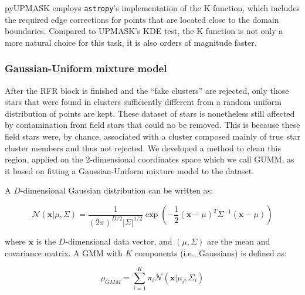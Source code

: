 \documentclass{aa}
\begin{document}
 pyUPMASK employs \texttt{astropy}'s implementation of the K function, which
 includes the required edge corrections for points that are located close to
 the domain boundaries. Compared to UPMASK's KDE test, the K function is not
 only a more natural choice for this task, it is also orders of magnitude
 faster.



\subsubsection{Gaussian-Uniform mixture model}
 \label{sssec:gumm}

 After the RFR block is finished and the ``fake clusters'' are rejected, only
 those stars that were found in clusters sufficiently different from a random
 uniform distribution of points are kept. These dataset of stars is
 nonetheless still affected by contamination from field stars that could no be
 removed. This is because these field stars were, by chance, associated with a
 cluster composed mainly of true star cluster members and thus not rejected.
 We developed a method to clean this region, applied on the 2-dimensional
 coordinates space which we call GUMM, as it based on fitting a
 Gaussian-Uniform mixture model to the dataset.

 A $D$-dimensional Gaussian distribution can be written as:

 \begin{equation}
 \mathcal{N}(\mathbf{x} | \mu, \Sigma)=
 \frac{1}{(2 \pi)^{D / 2}|\Sigma|^{1 / 2}}
 \exp \left(-\frac{1}{2}(\mathbf{x}-\mu)^{T} \Sigma^{-1}(\mathbf{x}-\mu)\right)
 \end{equation}

 \noindent where $\mathbf{x}$ is the $D$-dimensional data vector, and $
 (\mu,\Sigma)$ are the mean and covariance matrix.
 A GMM with $K$ components (i.e., Gaussians) is defined as:

 \begin{equation}
 \rho_{GMM}=\sum_{i=1}^{K} \pi_{i}
 \mathcal{N}\left(\mathbf{x} | \mu_{i}, \Sigma_{i}\right)
 \end{equation}
\end{document}
